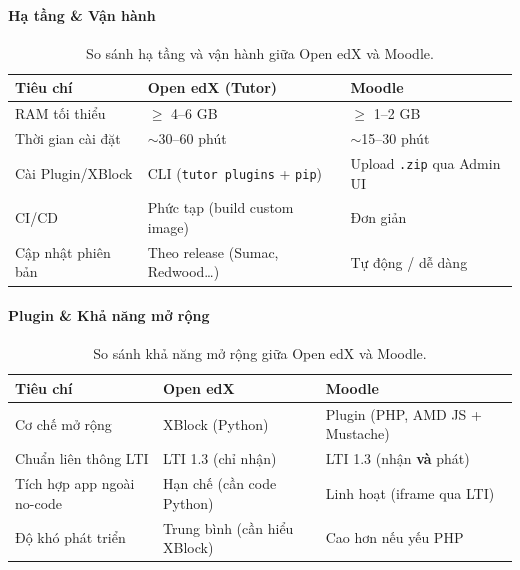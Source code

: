 \paragraph{Hạ tầng \& Vận hành}

\begin{table}[H]
    \centering
    \caption{So sánh hạ tầng và vận hành giữa Open edX và Moodle.}
    \label{tab:edx-moodle-infra}
    \begin{tabular}{p{4.5cm}p{4.5cm}p{5cm}}
        \toprule
        \textbf{Tiêu chí} & \textbf{Open edX (Tutor)} & \textbf{Moodle} \\
        \midrule
        RAM tối thiểu           & $\geq$ 4--6 GB                           & $\geq$ 1--2 GB \\
        Thời gian cài đặt       & $\sim$30--60 phút                        & $\sim$15--30 phút \\
        Cài Plugin/XBlock       & CLI (\texttt{tutor plugins} + \texttt{pip}) & Upload \texttt{.zip} qua Admin UI \\
        CI/CD                   & Phức tạp (build custom image)            & Đơn giản \\
        Cập nhật phiên bản      & Theo release (Sumac, Redwood\ldots)      & Tự động / dễ dàng \\
        \bottomrule
    \end{tabular}
\end{table}

\paragraph{Plugin \& Khả năng mở rộng}

\begin{table}[H]
    \centering
    \caption{So sánh khả năng mở rộng giữa Open edX và Moodle.}
    \label{tab:edx-moodle-plugin}
    \begin{tabular}{p{4.5cm}p{4.5cm}p{5cm}}
        \toprule
        \textbf{Tiêu chí} & \textbf{Open edX} & \textbf{Moodle} \\
        \midrule
        Cơ chế mở rộng             & XBlock (Python)           & Plugin (PHP, AMD JS + Mustache) \\
        Chuẩn liên thông LTI       & LTI 1.3 (chỉ nhận)        & LTI 1.3 (nhận \textbf{và} phát) \\
        Tích hợp app ngoài no-code & Hạn chế (cần code Python) & Linh hoạt (iframe qua LTI) \\
        Độ khó phát triển          & Trung bình (cần hiểu XBlock) & Cao hơn nếu yếu PHP \\
        \bottomrule
    \end{tabular}
\end{table}

